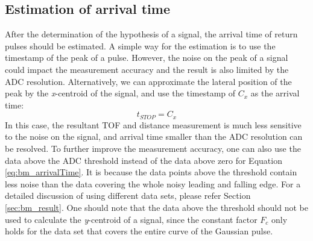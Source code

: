 \subsection{Estimation of arrival time}
After the determination of the hypothesis of a signal, the arrival time of return pulses should be estimated. A simple way for the estimation is to use the timestamp of the peak of a pulse. However, the noise on the peak of a signal could impact the measurement accuracy and the result is also limited by the ADC resolution. Alternatively, we can approximate the lateral position of the peak by the \textit{x}-centroid of the signal, and use the timestamp of $C_x$ as the arrival time:
\begin{equation} \label{eq:bm_arrivalTime}
    t_{STOP}=C_x
\end{equation}
In this case, the resultant TOF and distance measurement is much less sensitive to the noise on the signal, and arrival time smaller than the ADC resolution can be resolved. To further improve the measurement accuracy, one can also use the data above the ADC threshold instead of the data above zero for Equation \eqref{eq:bm_arrivalTime}. It is because the data points above the threshold contain less noise than the data covering the whole noisy leading and falling edge. For a detailed discussion of using different data sets, please refer Section \ref{sec:bm_result}. One should note that the data above the threshold should not be used to calculate the \textit{y}-centroid of a signal, since the constant factor $F_c$ only holds for the data set that covers the entire curve of the Gaussian pulse.
